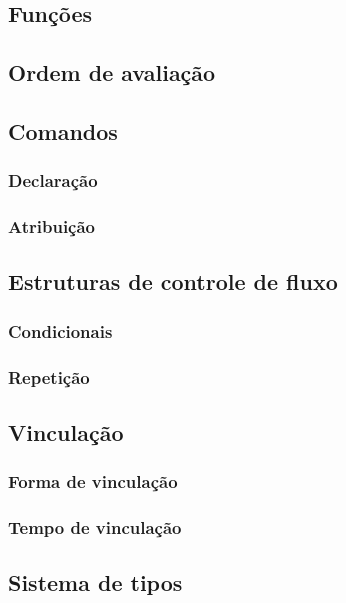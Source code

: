 \documentclass[a4 paper, 12pt]{article}
\begin{document}
\subsection{Fun\c c\~oes}

\subsection{Ordem de avalia\c c\~ao}
\subsection{Comandos}
\subsubsection{Declara\c c\~ao}
\subsubsection{Atribui\c c\~ao}

\subsection{Estruturas de controle de fluxo}
\subsubsection{Condicionais}

\subsubsection{Repeti\c c\~ao}
\subsection{Vincula\c c\~ao}
\subsubsection{Forma de vincula\c c\~ao}

\subsubsection{Tempo de vincula\c c\~ao}
\subsection{Sistema de tipos}
\end{document}
